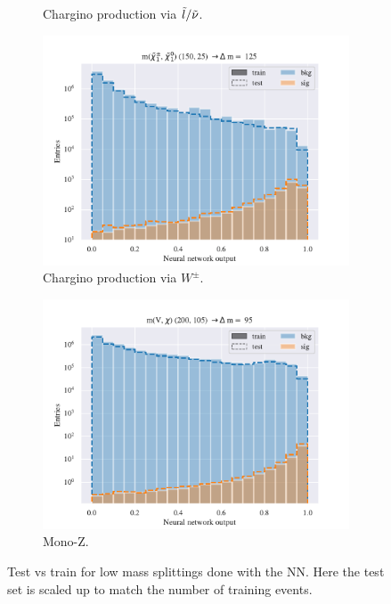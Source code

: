 \begin{figure}[H]
\begin{subfigure}[t!]{0.49\textwidth}
        \caption{Chargino production via $\Tilde{l}/\Tilde{\nu}$.}
        \label{fig:SlepsnuNNLow}
    \end{subfigure}    
    \begin{subfigure}[t!]{0.49\textwidth}
        \includegraphics[width = \textwidth]{Figures/WW/NN/All_level/Low/scaled_train_test_395268.pdf}
        \caption{Chargino production via $W^\pm$.}
        \label{fig:WWNNLow}
    \end{subfigure}
    \begin{subfigure}[t!]{0.49\textwidth}
        \includegraphics[width = \textwidth]{Figures/Mono_Z/ML/NN/All_level/Low/scaled_train_test_310604.pdf}
        \caption{Mono-Z.}
        \label{fig:MonoZNNLow}
    \end{subfigure}
    \caption{Test vs train for low mass splittings done with the NN. Here the test set is scaled up to match the number of training events.}
    \label{fig:AllLowNN}
\end{figure}

